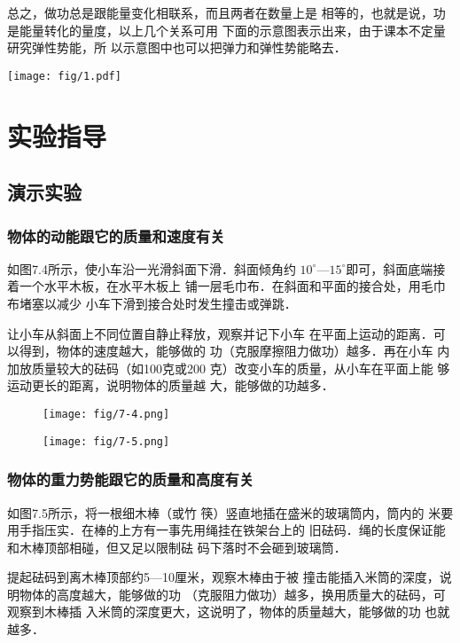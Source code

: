 总之，做功总是跟能量变化相联系，而且两者在数量上是
相等的，也就是说，功是能量转化的量度，以上几个关系可用
下面的示意图表示出来，由于课本不定量研究弹性势能，所
以示意图中也可以把弹力和弹性势能略去．

\begin{center}
\texttt{[image: fig/1.pdf]}
\end{center}

\section{实验指导}
\subsection{演示实验}
\subsubsection{物体的动能跟它的质量和速度有关}
如图7.4所示，使小车沿一光滑斜面下滑．斜面倾角约
$10^{\circ}$—$15^{\circ}$即可，斜面底端接着一个水平木板，在水平木板上
铺一层毛巾布．在斜面和平面的接合处，用毛巾布堵塞以减少
小车下滑到接合处时发生撞击或弹跳．

让小车从斜面上不同位置自静止释放，观察并记下小车
在平面上运动的距离．可以得到，物体的速度越大，能够做的
功（克服摩擦阻力做功）越多．再在小车
内加放质量较大的砝码（如100克或200
克）改变小车的质量，从小车在平面上能
够运动更长的距离，说明物体的质量越
大，能够做的功越多．

\begin{figure}[htp]\centering
    \begin{minipage}[t]{0.48\textwidth}
    \centering
\texttt{[image: fig/7-4.png]}
    \caption{}
    \end{minipage}
    \begin{minipage}[t]{0.48\textwidth}
    \centering
\texttt{[image: fig/7-5.png]}
    \caption{}
    \end{minipage}
    \end{figure}


\subsubsection{物体的重力势能跟它的质量和高度有关}
如图7.5所示，将一根细木棒（或竹
筷）竖直地插在盛米的玻璃筒内，筒内的
米要用手指压实．在棒的上方有一事先用绳挂在铁架台上的
旧砝码．绳的长度保证能和木棒顶部相碰，但又足以限制砝
码下落时不会砸到玻璃筒．


提起砝码到离木棒顶部约5—10厘米，观察木棒由于被
撞击能插入米筒的深度，说明物体的高度越大，能够做的功
（克服阻力做功）越多，换用质量大的砝码，可观察到木棒插
入米筒的深度更大，这说明了，物体的质量越大，能够做的功
也就越多．

